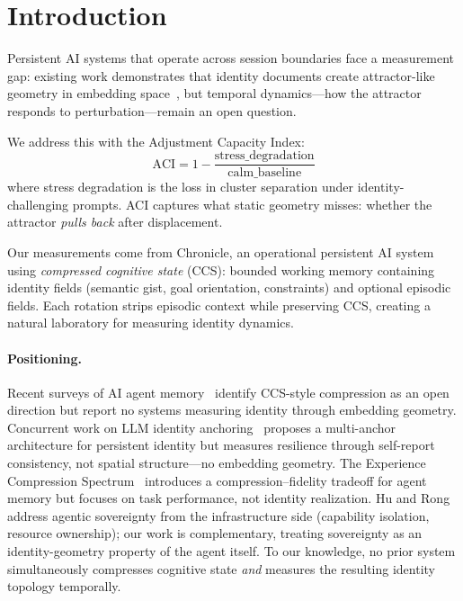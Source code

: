 \documentclass[11pt,a4paper]{article}
\begin{document}
\section{Introduction}

Persistent AI systems that operate across session boundaries face a measurement
gap: existing work demonstrates that identity documents create attractor-like
geometry in embedding space~\cite{vasilenko2026}, but temporal dynamics---how
the attractor responds to perturbation---remain an open question.

We address this with the Adjustment Capacity Index:
\begin{equation}
\text{ACI} = 1 - \frac{\text{stress\_degradation}}{\text{calm\_baseline}}
\end{equation}
where stress degradation is the loss in cluster separation under identity-challenging
prompts. ACI captures what static geometry misses: whether the attractor \emph{pulls back}
after displacement.

Our measurements come from Chronicle, an operational persistent AI system using
\emph{compressed cognitive state} (CCS): bounded working memory containing identity
fields (semantic gist, goal orientation, constraints) and optional episodic fields.
Each rotation strips episodic context while preserving CCS, creating a natural
laboratory for measuring identity dynamics.

\paragraph{Positioning.} Recent surveys of AI agent memory~\cite{mem0survey2026}
identify CCS-style compression as an open direction but report no systems measuring
identity through embedding geometry. Concurrent work on LLM identity
anchoring~\cite{menon2026} proposes a multi-anchor architecture for persistent
identity but measures resilience through self-report consistency, not spatial
structure---no embedding geometry. The Experience Compression
Spectrum~\cite{zhang2026ecs} introduces a compression--fidelity
tradeoff for agent memory but focuses on task performance, not identity
realization. Hu and Rong~\cite{hu2026sovereign} address agentic sovereignty from
the infrastructure side (capability isolation, resource ownership); our work is
complementary, treating sovereignty as an identity-geometry property of the agent
itself. To our knowledge, no prior system simultaneously compresses cognitive
state \emph{and} measures the resulting identity topology temporally.
\end{document}
